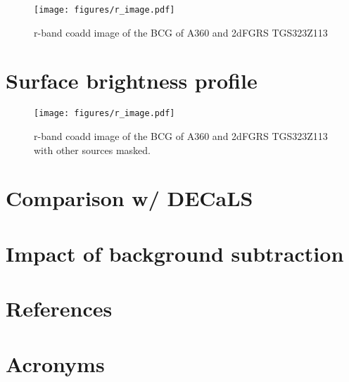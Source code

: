 \documentclass[SE,lsstdraft,authoryear,toc]{lsstdoc}
\begin{document}
\begin{figure}[htbp]
  \centering
  \texttt{[image: figures/r\_image.pdf]}
  \caption{r-band coadd image of the BCG of A360 and 2dFGRS TGS323Z113 }
  \label{fig:r_image}
\end{figure}


\section{Surface brightness profile}



\begin{figure}[htbp]
  \centering
  \texttt{[image: figures/r\_image.pdf]}
  \caption{r-band coadd image of the BCG of A360 and 2dFGRS TGS323Z113 with other sources masked.}
  \label{fig:r_image}
\end{figure}

\section{Comparison w/ DECaLS}

\section{Impact of background subtraction}


\appendix
\section{References} \label{sec:bib}
\renewcommand{\refname}{} %


\section{Acronyms} \label{sec:acronyms}

\end{document}
